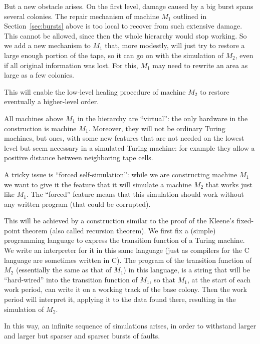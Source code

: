 \documentclass[12pt]{memoir}
\begin{document}
But a new obstacle arises.
On the first level, damage caused by a big burst spans several colonies.
The repair mechanism of machine \( M_1 \) outlined in Section~\ref{sec:bursts} above 
is too local to recover from such extensive damage.
This cannot be allowed, since then the whole hierarchy would stop working.
So we add a new mechanism to \( M_{1} \) that, more modestly,
will just try to restore a large enough portion of the
tape, so it can go on with the simulation of \( M_2 \), even if all 
original information was lost.
For this, \( M_{1} \) may need to rewrite an area as large as a few colonies.

This will enable the low-level healing procedure of 
machine \( M_{2} \) to restore eventually a higher-level order.

All machines above \( M_1 \) in the hierarchy are
``virtual'': the only hardware in the construction is machine \( M_1 \).
Moreover, they will not be ordinary Turing machines, but  ones,
with some new features that are not needed on the lowest level but seem necessary
in a simulated Turing machine: for example they
allow a positive distance between neighboring tape cells.

A tricky issue is ``forced self-simulation'': while we are constructing machine \( M_1 \)
we want to give it the feature that it will simulate a machine \( M_{2} \) that
works just like \( M_{1} \).
The ``forced'' feature means that this simulation should
work without any written program (that could be corrupted).

This will be achieved by
a construction similar to the proof of the Kleene's fixed-point 
theorem (also called recursion theorem).
We first fix a (simple) programming language to express the transition
function of a Turing machine.
We write an interpreter for it in this same language (just as compilers for the 
C language are sometimes written in C).
The program of the transition function of \( M_{2} \)
(essentially the same as that of \( M_{1} \))
in this language, is a string that will be
``hard-wired'' into the transition function of \( M_{1} \), 
so that \( M_{1} \), at the start of each work period, can write
it on a working track of the base colony.
Then the work period will interpret it, 
applying it to the data found there, resulting
in the simulation of \( M_{2} \).

In this way, an infinite sequence of simulations arises, in order
to withstand larger and larger but sparser and sparser bursts of faults.
\end{document}
